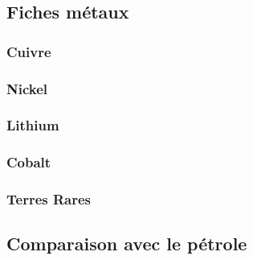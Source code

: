 \documentclass{article}
\begin{document}
\subsection{Fiches métaux}
\label{section:fiches}

\clearpage
\begin{center}
\subsubsection*{Cuivre}
\end{center}

\begin{center}
\subsubsection*{Nickel}
\end{center}

\begin{center}
\subsubsection*{Lithium}
\end{center}

\begin{center}
\subsubsection*{Cobalt}
\end{center}

\begin{center}
\subsubsection*{Terres Rares}
\end{center}

\clearpage
\subsection{Comparaison avec le pétrole}
\label{section:comparaison}

\clearpage
\end{document}

